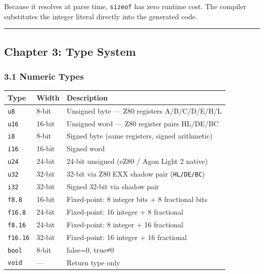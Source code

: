 \documentclass[
  11pt,
]{article}
\begin{document}
Because it resolves at parse time, \texttt{sizeof} has zero runtime
cost. The compiler substitutes the integer literal directly into the
generated code.

\begin{center}\rule{0.5\linewidth}{0.5pt}\end{center}

\subsection{Chapter 3: Type System}\label{chapter-3-type-system}

\subsubsection{3.1 Numeric Types}\label{numeric-types}

\begin{longtable}[]{@{}lll@{}}
\toprule\noalign{}
Type & Width & Description \\
\midrule\noalign{}
\endhead
\bottomrule\noalign{}
\endlastfoot
\texttt{u8} & 8-bit & Unsigned byte --- Z80 registers A/B/C/D/E/H/L \\
\texttt{u16} & 16-bit & Unsigned word --- Z80 register pairs HL/DE/BC \\
\texttt{i8} & 8-bit & Signed byte (same registers, signed arithmetic) \\
\texttt{i16} & 16-bit & Signed word \\
\texttt{u24} & 24-bit & 24-bit unsigned (eZ80 / Agon Light 2 native) \\
\texttt{u32} & 32-bit & 32-bit via Z80 EXX shadow pair
(\texttt{HL\textquotesingle{}/DE\textquotesingle{}/BC\textquotesingle{}}) \\
\texttt{i32} & 32-bit & Signed 32-bit via shadow pair \\
\texttt{f8.8} & 16-bit & Fixed-point: 8 integer bits + 8 fractional
bits \\
\texttt{f16.8} & 24-bit & Fixed-point: 16 integer + 8 fractional \\
\texttt{f8.16} & 24-bit & Fixed-point: 8 integer + 16 fractional \\
\texttt{f16.16} & 32-bit & Fixed-point: 16 integer + 16 fractional \\
\texttt{bool} & 8-bit & false=0, true≠0 \\
\texttt{void} & --- & Return type only \\
\end{longtable}
\end{document}
